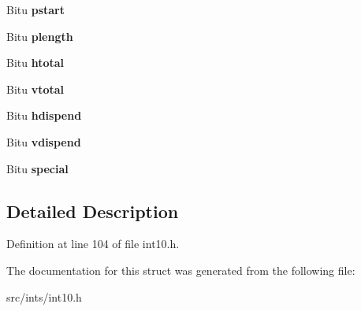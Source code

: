 \begin{DoxyCompactItemize}
\item 
\hypertarget{structVideoModeBlock_ae53459e4e4978f0262a8008199fd1837}{Bitu {\bfseries pstart}}\label{structVideoModeBlock_ae53459e4e4978f0262a8008199fd1837}

\item 
\hypertarget{structVideoModeBlock_ac61dd9ff708f53231ca143d564133e29}{Bitu {\bfseries plength}}\label{structVideoModeBlock_ac61dd9ff708f53231ca143d564133e29}

\item 
\hypertarget{structVideoModeBlock_acb39e7559e59d3d9527c0a46499a423e}{Bitu {\bfseries htotal}}\label{structVideoModeBlock_acb39e7559e59d3d9527c0a46499a423e}

\item 
\hypertarget{structVideoModeBlock_a8f86cecb0e1da8e4092ba9a8b8c7eaaa}{Bitu {\bfseries vtotal}}\label{structVideoModeBlock_a8f86cecb0e1da8e4092ba9a8b8c7eaaa}

\item 
\hypertarget{structVideoModeBlock_a7d7c7b224dfdb93cfb1af7fed4a5c9cf}{Bitu {\bfseries hdispend}}\label{structVideoModeBlock_a7d7c7b224dfdb93cfb1af7fed4a5c9cf}

\item 
\hypertarget{structVideoModeBlock_a4b3b1f96351ad6e6c435ff27953b7526}{Bitu {\bfseries vdispend}}\label{structVideoModeBlock_a4b3b1f96351ad6e6c435ff27953b7526}

\item 
\hypertarget{structVideoModeBlock_abcb9b2b01871da775e89519c4dcb8d0c}{Bitu {\bfseries special}}\label{structVideoModeBlock_abcb9b2b01871da775e89519c4dcb8d0c}

\end{DoxyCompactItemize}


\subsection{Detailed Description}


Definition at line 104 of file int10.\-h.



The documentation for this struct was generated from the following file\-:\begin{DoxyCompactItemize}
\item 
src/ints/int10.\-h\end{DoxyCompactItemize}
